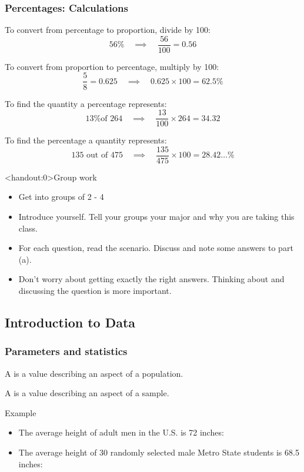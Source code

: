 \documentclass[xcolor=table, aspectratio=169, bigger, handout]{beamer}
\begin{document}
\begin{frame}
\frametitle{Percentages: Calculations}
\begin{exampleblock}{}
To convert from percentage to proportion, divide by 100:
\[56\% \quad \implies \quad \frac {56}{100} = 0.56\]

To convert from proportion to percentage, multiply by 100:
\[\frac 5 8 = 0.625 \quad \implies \quad 0.625 \times 100 = 62.5\%\]

To find the quantity a percentage represents:
\[\text{13\% of 264}\quad \implies \quad \frac {13}{100} \times 264 = 34.32\]

To find the percentage a quantity represents:
\[\text{135 out of 475} \quad \implies \quad \frac {135}{475} \times 100 = 28.42\ldots \%\]
\end{exampleblock}
\end{frame}

\begin{frame}<handout:0>{Group work}
\begin{block}{}

\begin{itemize}
\item Get into groups of 2 - 4
\item Introduce yourself. Tell your groups your major and why you are taking this class. 
\item For each question, read the scenario. Discuss and note some answers to part (a).
\item Don't worry about getting exactly the right answers. Thinking about and discussing the question is more important.
\end{itemize}
\end{block}
\end{frame}


%
%
\subsection{Introduction to Data}

\begin{frame}
\frametitle{Parameters and statistics}

\begin{block}{}
A  is a value describing an aspect of a population.
\end{block}
\pause
\begin{block}{}
A  is a value describing an aspect of a sample.
\end{block}
\pause
\begin{exampleblock}{Example}
\begin{itemize}
\item The average height of adult men in the U.S. is 72 inches: 

\item The average height of 30 randomly selected male Metro State students is 68.5 inches: 
\end{itemize}
\end{exampleblock}

\end{frame}
\end{document}
